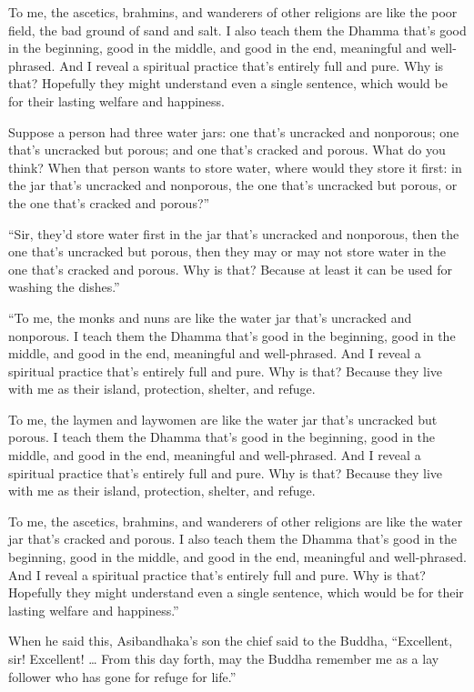 \documentclass[12pt,openany]{book}%
\begin{document}
To me, the ascetics, brahmins, and wanderers of other religions are like the poor field, the bad ground of sand and salt. I also teach them the Dhamma that’s good in the beginning, good in the middle, and good in the end, meaningful and well-phrased. And I reveal a spiritual practice that’s entirely full and pure. Why is that? Hopefully they might understand even a single sentence, which would be for their lasting welfare and happiness. 

Suppose a person had three water jars: one that’s uncracked and nonporous; one that’s uncracked but porous; and one that’s cracked and porous. What do you think? When that person wants to store water, where would they store it first: in the jar that’s uncracked and nonporous, the one that’s uncracked but porous, or the one that’s cracked and porous?” 

“Sir, they’d store water first in the jar that’s uncracked and nonporous, then the one that’s uncracked but porous, then they may or may not store water in the one that’s cracked and porous. Why is that? Because at least it can be used for washing the dishes.” 

“To me, the monks and nuns are like the water jar that’s uncracked and nonporous. I teach them the Dhamma that’s good in the beginning, good in the middle, and good in the end, meaningful and well-phrased. And I reveal a spiritual practice that’s entirely full and pure. Why is that? Because they live with me as their island, protection, shelter, and refuge. 

To me, the laymen and laywomen are like the water jar that’s uncracked but porous. I teach them the Dhamma that’s good in the beginning, good in the middle, and good in the end, meaningful and well-phrased. And I reveal a spiritual practice that’s entirely full and pure. Why is that? Because they live with me as their island, protection, shelter, and refuge. 

To me, the ascetics, brahmins, and wanderers of other religions are like the water jar that’s cracked and porous. I also teach them the Dhamma that’s good in the beginning, good in the middle, and good in the end, meaningful and well-phrased. And I reveal a spiritual practice that’s entirely full and pure. Why is that? Hopefully they might understand even a single sentence, which would be for their lasting welfare and happiness.” 

When he said this, Asibandhaka’s son the chief said to the Buddha, “Excellent, sir! Excellent! … From this day forth, may the Buddha remember me as a lay follower who has gone for refuge for life.” 
\end{document}
